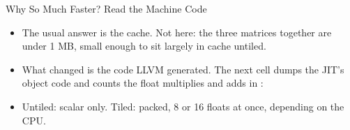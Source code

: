 \documentclass[aspectratio=169,10pt]{beamer}
\begin{document}
\begin{frame}{Why So Much Faster? Read the Machine Code}
  \begin{itemize}
    \item<1-> The usual answer is the cache. Not here: the three matrices
      together are under 1 MB, small enough to sit largely in cache untiled.
    \item<2-> What changed is the \alert{code LLVM generated}. The next cell
      dumps the JIT's object code and counts the float multiplies and adds in
      :
  \end{itemize}
  \vspace{0.3em}
  \vspace{0.3em}
  \begin{itemize}
    \item<3-> Untiled: \alert{scalar only}. Tiled: \alert{packed}, 8 or 16
      floats at once, depending on the CPU.
  \end{itemize}
\end{frame}
\end{document}
